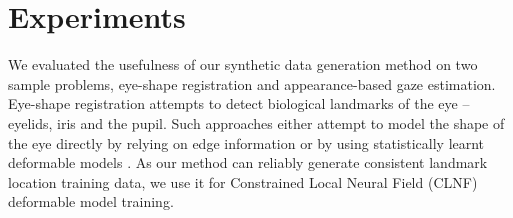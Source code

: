 
\section{Experiments}




% 


We evaluated the usefulness of our synthetic data generation method on two sample problems, eye-shape registration and appearance-based gaze estimation.
%
Eye-shape registration attempts to detect biological landmarks of the eye -- eyelids, iris and the pupil. 
Such approaches either attempt to model the shape of the eye directly by relying on edge information \cite{wood2014eyetab, swirski2012robust} or by using statistically learnt deformable models \cite{alabort2014statistically}. 
As our method can reliably generate consistent landmark location training data, we use it for Constrained Local Neural Field (CLNF) \cite{baltrusaitis2013constrained} deformable model training.

